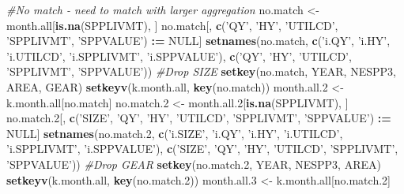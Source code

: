 \documentclass[]{article}
\newenvironment{Shaded}{\begin{snugshade}}{\end{snugshade}}
\newcommand{\KeywordTok}[1]{\textcolor[rgb]{0.13,0.29,0.53}{\textbf{#1}}}
\newcommand{\DecValTok}[1]{\textcolor[rgb]{0.00,0.00,0.81}{#1}}
\newcommand{\StringTok}[1]{\textcolor[rgb]{0.31,0.60,0.02}{#1}}
\newcommand{\CommentTok}[1]{\textcolor[rgb]{0.56,0.35,0.01}{\textit{#1}}}
\newcommand{\OtherTok}[1]{\textcolor[rgb]{0.56,0.35,0.01}{#1}}
\newcommand{\OperatorTok}[1]{\textcolor[rgb]{0.81,0.36,0.00}{\textbf{#1}}}
\newcommand{\ErrorTok}[1]{\textcolor[rgb]{0.64,0.00,0.00}{\textbf{#1}}}
\newcommand{\NormalTok}[1]{#1}
\begin{document}
\begin{Shaded}
\begin{Highlighting}[]
{{{{{{{{{{{{{{{{{{{{{  \CommentTok{#No match - need to match with larger aggregation}
\NormalTok{  no.match  <-}\StringTok{ }\NormalTok{month.all[}\KeywordTok{is.na}\NormalTok{(SPPLIVMT), ]}
\NormalTok{  no.match[, }\KeywordTok{c}\NormalTok{(}\StringTok{'QY'}\NormalTok{, }\StringTok{'HY'}\NormalTok{, }\StringTok{'UTILCD'}\NormalTok{, }\StringTok{'SPPLIVMT'}\NormalTok{, }\StringTok{'SPPVALUE'}\NormalTok{) }\OperatorTok{:}\ErrorTok{=}\StringTok{ }\OtherTok{NULL}\NormalTok{]}
  \KeywordTok{setnames}\NormalTok{(no.match, }\KeywordTok{c}\NormalTok{(}\StringTok{'i.QY'}\NormalTok{, }\StringTok{'i.HY'}\NormalTok{, }\StringTok{'i.UTILCD'}\NormalTok{, }\StringTok{'i.SPPLIVMT'}\NormalTok{, }\StringTok{'i.SPPVALUE'}\NormalTok{), }
           \KeywordTok{c}\NormalTok{(}\StringTok{'QY'}\NormalTok{, }\StringTok{'HY'}\NormalTok{, }\StringTok{'UTILCD'}\NormalTok{, }\StringTok{'SPPLIVMT'}\NormalTok{, }\StringTok{'SPPVALUE'}\NormalTok{))}
  \CommentTok{#Drop SIZE}
  \KeywordTok{setkey}\NormalTok{(no.match, YEAR, NESPP3, AREA, GEAR)}
  \KeywordTok{setkeyv}\NormalTok{(k.month.all, }\KeywordTok{key}\NormalTok{(no.match))}
\NormalTok{  month.all.}\DecValTok{2}\NormalTok{ <-}\StringTok{ }\NormalTok{k.month.all[no.match]}
\NormalTok{  no.match.}\DecValTok{2}\NormalTok{ <-}\StringTok{ }\NormalTok{month.all.}\DecValTok{2}\NormalTok{[}\KeywordTok{is.na}\NormalTok{(SPPLIVMT), ]}
\NormalTok{  no.match.}\DecValTok{2}\NormalTok{[, }\KeywordTok{c}\NormalTok{(}\StringTok{'SIZE'}\NormalTok{, }\StringTok{'QY'}\NormalTok{, }\StringTok{'HY'}\NormalTok{, }\StringTok{'UTILCD'}\NormalTok{, }\StringTok{'SPPLIVMT'}\NormalTok{, }\StringTok{'SPPVALUE'}\NormalTok{) }\OperatorTok{:}\ErrorTok{=}\StringTok{ }\OtherTok{NULL}\NormalTok{]}
  \KeywordTok{setnames}\NormalTok{(no.match.}\DecValTok{2}\NormalTok{, }\KeywordTok{c}\NormalTok{(}\StringTok{'i.SIZE'}\NormalTok{, }\StringTok{'i.QY'}\NormalTok{, }\StringTok{'i.HY'}\NormalTok{, }\StringTok{'i.UTILCD'}\NormalTok{, }\StringTok{'i.SPPLIVMT'}\NormalTok{, }\StringTok{'i.SPPVALUE'}\NormalTok{), }
           \KeywordTok{c}\NormalTok{(}\StringTok{'SIZE'}\NormalTok{, }\StringTok{'QY'}\NormalTok{, }\StringTok{'HY'}\NormalTok{, }\StringTok{'UTILCD'}\NormalTok{, }\StringTok{'SPPLIVMT'}\NormalTok{, }\StringTok{'SPPVALUE'}\NormalTok{))}
  \CommentTok{#Drop GEAR}
  \KeywordTok{setkey}\NormalTok{(no.match.}\DecValTok{2}\NormalTok{, YEAR, NESPP3, AREA)}
  \KeywordTok{setkeyv}\NormalTok{(k.month.all, }\KeywordTok{key}\NormalTok{(no.match.}\DecValTok{2}\NormalTok{))}
\NormalTok{  month.all.}\DecValTok{3}\NormalTok{ <-}\StringTok{ }\NormalTok{k.month.all[no.match.}\DecValTok{2}\NormalTok{]}
}}}}}}}}}}}}}}}}}}}}}
\end{Highlighting}
\end{Shaded}
\end{document}
